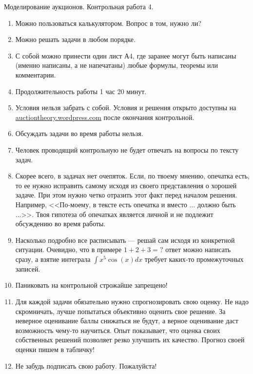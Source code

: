 \documentclass[pdftex,12pt,a4paper]{article}
\begin{document}


\begin{Large}
Моделирование аукционов. Контрольная работа 4.
\end{Large}

\begin{enumerate}
\item Можно пользоваться калькулятором. Вопрос в том, нужно ли?
\item Можно решать задачи в любом порядке.
\item С собой можно принести один лист А4, где заранее могут быть написаны (именно написаны, а не напечатаны) любые формулы, теоремы или комментарии.
\item Продолжительность работы 1 час 20 минут.
\item Условия нельзя забрать с собой. Условия и решения открыто доступны на \url{auctiontheory.wordpress.com} после окончания контрольной.
\item Обсуждать задачи во время работы нельзя.
\item Человек проводящий контрольную не будет отвечать на вопросы по тексту задач. 
\item Скорее всего, в задачах нет очепяток. Если, по твоему мнению, опечатка есть, то ее нужно исправить самому исходя из своего представления о хорошей задаче. При этом нужно четко отразить этот факт перед началом решения. Например, <<По-моему, в тексте есть опечатка и вместо ... должно быть ...>>. Твоя гипотеза об опечатках является личной и не подлежит обсуждению во время работы.
\item Насколько подробно все расписывать --- решай сам исходя из конкретной ситуации. Очевидно, что в примере $ 1+2+3=? $ ответ можно написать сразу, а взятие интеграла $ \int x^{5}\cos(x)dx $ требует каких-то промежуточных записей.
\item Паниковать на контрольной строжайше запрещено!
\item Для каждой задачи обязательно нужно спрогнозировать свою оценку. Не надо скромничать, лучше попытаться объективно оценить свое решение.  За неверное оценивание баллы снижаться не будут, а верное оценивание даст возможность чему-то научиться. Опыт показывает, что оценка своих собственных решений позволяет резко улучшить их качество. Прогноз своей оценки пишем в табличку!
\item Не забудь подписать свою работу. Пожалуйста!

\end{enumerate}
\end{document}
